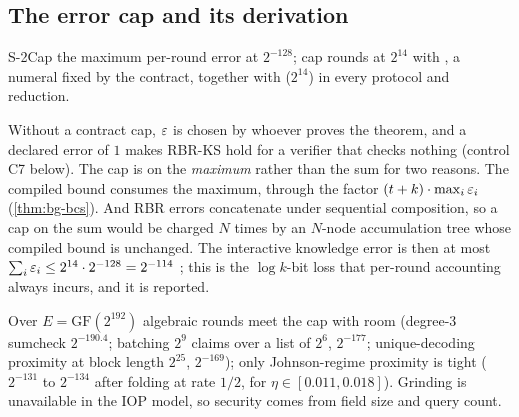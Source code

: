\subsection{The error cap and its derivation}\label{subsec:sec-cap}

\begin{decision}{S-2}{Cap the maximum per-round error at $2^{-128}$; cap rounds at $2^{14}$}
 with , a numeral fixed by the
contract, together with  ($2^{14}$) in every protocol and reduction.
\end{decision}

\noindent Without a contract cap, $\varepsilon$ is chosen by whoever proves the theorem, and a declared
error of $1$ makes RBR-KS hold for a verifier that checks nothing (control C7 below). The cap is on
the \emph{maximum} rather than the sum for two reasons. The compiled bound consumes the maximum,
through the factor $(t+k)\cdot\max_i\varepsilon_i$ (\cref{thm:bg-bcs}). And RBR errors concatenate under
sequential composition, so a cap on the sum would be charged $N$ times by an $N$-node
accumulation tree whose compiled bound is unchanged. The interactive knowledge error is then at most
$\sum_i\varepsilon_i\le 2^{14}\cdot2^{-128}=2^{-114}$ \cite[Claim~31.1.3]{CY24-Book}; this is the
$\log k$-bit loss that per-round accounting always incurs, and it is reported.

Over $E=\mathrm{GF}(2^{192})$ algebraic rounds meet the cap with room (degree-3 sumcheck
$2^{-190.4}$; batching $2^9$ claims over a list of $2^6$, $2^{-177}$; unique-decoding proximity at
block length $2^{25}$, $2^{-169}$); only Johnson-regime proximity is tight ($2^{-131}$ to $2^{-134}$
after folding at rate $1/2$, for $\eta\in[0.011,0.018]$). Grinding is unavailable in the IOP model,
so security comes from field size and query count.

